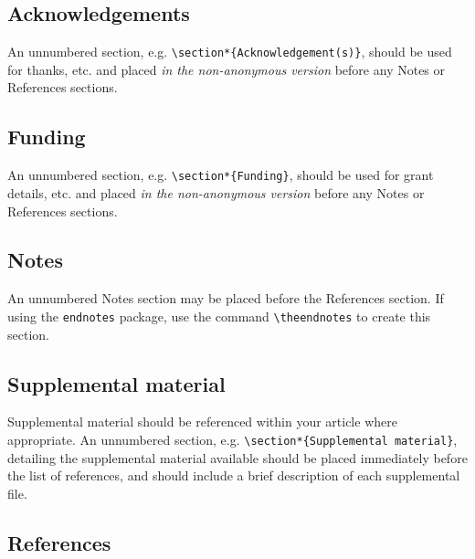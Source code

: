 \documentclass{tBPS2e}
\theoremstyle{plain}
\theoremstyle{definition}
\theoremstyle{remark}
\begin{document}
\subsection{Acknowledgements}

An unnumbered section, e.g. \verb"\section*{Acknowledgement(s)}", should be used for thanks, etc.
and placed \emph{in the non-anonymous version} before any Notes or References sections.


\subsection{Funding}

An unnumbered section, e.g. \verb"\section*{Funding}", should be used for grant details, etc.
and placed \emph{in the non-anonymous version} before any Notes or References sections.


\subsection{Notes}

An unnumbered Notes section may be placed before the References section. If using the \verb"endnotes" package, use the command \verb"\theendnotes" to create this section.


\subsection{Supplemental material}

Supplemental material should be referenced within your article where appropriate. An unnumbered section, e.g. \verb"\section*{Supplemental material}", detailing the supplemental material available should be placed immediately before the list of references, and should include a brief description of each supplemental file.


\subsection{References}\label{refs}
\end{document}
